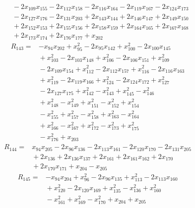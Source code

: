{\begin{align*}
&{}  - 2x_{109} x_{155} - 2x_{112} x_{158} - 2x_{116} x_{164} - 2x_{119} x_{167} - 2x_{124} x_{173} \\
&{}  - 2x_{127} x_{176} - 2x_{131} x_{203} + 2x_{143} x_{144} + 2x_{146} x_{147} + 2x_{149} x_{150} \\
&{}  + 2x_{152} x_{153} + 2x_{155} x_{156} + 2x_{158} x_{159} + 2x_{164} x_{165} + 2x_{167} x_{168} \\
&{}  + 2x_{173} x_{174} + 2x_{176} x_{177} + x_{202}
\end{align*}
\begin{align*}
R_{143} ={}& -x_{94} x_{202} + x_{95}^{2} - 2x_{95} x_{142} + x_{100}^{2} - 2x_{100} x_{145} \\
&{}  + x_{103}^{2} - 2x_{103} x_{148} + x_{106}^{2} - 2x_{106} x_{151} + x_{109}^{2} \\
&{}  - 2x_{109} x_{154} + x_{112}^{2} - 2x_{112} x_{157} + x_{116}^{2} - 2x_{116} x_{163} \\
&{}  + x_{119}^{2} - 2x_{119} x_{166} + x_{124}^{2} - 2x_{124} x_{172} + x_{127}^{2} \\
&{}  - 2x_{127} x_{175} + x_{142}^{2} - x_{143}^{2} + x_{145}^{2} - x_{146}^{2} \\
&{}  + x_{148}^{2} - x_{149}^{2} + x_{151}^{2} - x_{152}^{2} + x_{154}^{2} \\
&{}  - x_{155}^{2} + x_{157}^{2} - x_{158}^{2} + x_{163}^{2} - x_{164}^{2} \\
&{}  + x_{166}^{2} - x_{167}^{2} + x_{172}^{2} - x_{173}^{2} + x_{175}^{2} \\
&{}  - x_{176}^{2} + x_{203}
\end{align*}
\begin{align*}
R_{144} ={}& x_{94} x_{205} - 2x_{96} x_{136} - 2x_{113} x_{161} - 2x_{120} x_{170} - 2x_{131} x_{205} \\
&{}  + 2x_{136} + 2x_{136} x_{137} + 2x_{161} + 2x_{161} x_{162} + 2x_{170} \\
&{}  + 2x_{170} x_{171} + x_{204} - x_{205}
\end{align*}
\begin{align*}
R_{145} ={}& -x_{94} x_{204} + x_{96}^{2} - 2x_{96} x_{135} + x_{113}^{2} - 2x_{113} x_{160} \\
&{}  + x_{120}^{2} - 2x_{120} x_{169} + x_{135}^{2} - x_{136}^{2} + x_{160}^{2} \\
&{}  - x_{161}^{2} + x_{169}^{2} - x_{170}^{2} + x_{204} + x_{205}
\end{align*}
}
